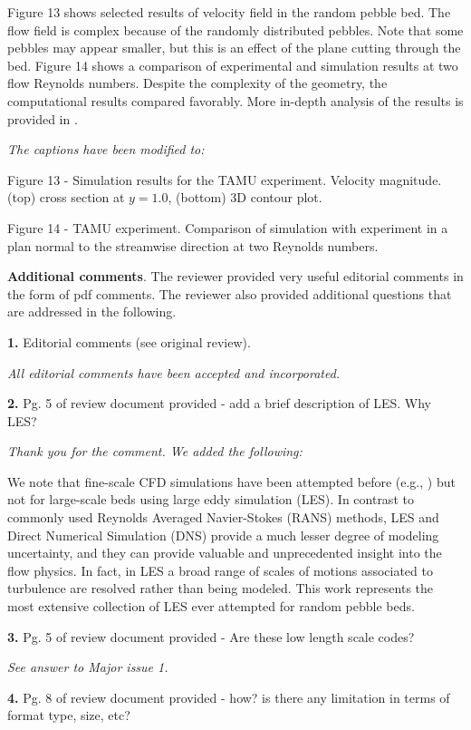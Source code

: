 \documentclass{nseJournal}
\begin{document}
Figure 13 shows selected results of velocity field in the random pebble bed. The flow field is complex because of the randomly distributed pebbles. Note that some pebbles may appear smaller, but this is an effect of the plane cutting through the bed. Figure 14 shows a comparison of experimental and simulation results at two flow Reynolds numbers. Despite the complexity of the geometry, the computational results compared favorably. More in-depth analysis of the results is provided in \cite{yildiz2020direct}.

\textit{The captions have been modified to: }

Figure 13 - Simulation results for the TAMU experiment. Velocity magnitude. (top) cross section at $y=1.0$, (bottom) 3D contour plot.

Figure 14 - TAMU experiment. Comparison of simulation with experiment in a plan normal to the streamwise direction at two Reynolds numbers.

\textbf{Additional comments}.  The reviewer provided very useful editorial comments in the form of pdf comments. The reviewer also provided additional questions that are addressed in the following.

\textbf{1.} Editorial comments (see original review).

\textit{All editorial comments have been accepted and incorporated.}

\textbf{2.} Pg. 5 of review document provided - add a brief description of LES. Why LES?

\textit{Thank you for the comment. We added the following:}

We note that fine-scale CFD simulations have been attempted before (e.g., \cite{vanstaden2018}) but not for large-scale beds using large eddy simulation (LES).  In contrast to commonly used  Reynolds Averaged Navier-Stokes (RANS) methods, LES and Direct Numerical Simulation (DNS) provide a much lesser degree of modeling uncertainty, and they can provide valuable and unprecedented insight into the flow physics. In fact, in LES a broad range of scales of motions associated to turbulence are resolved rather than being modeled. This work represents the most extensive collection of LES ever attempted for random pebble beds.

\textbf{3.} Pg. 5 of review document provided - Are these low length scale codes?

\textit{See answer to Major issue 1.}

\textbf{4.} Pg. 8 of review document provided - how? is there any limitation in terms of format type, size, etc?
\end{document}
